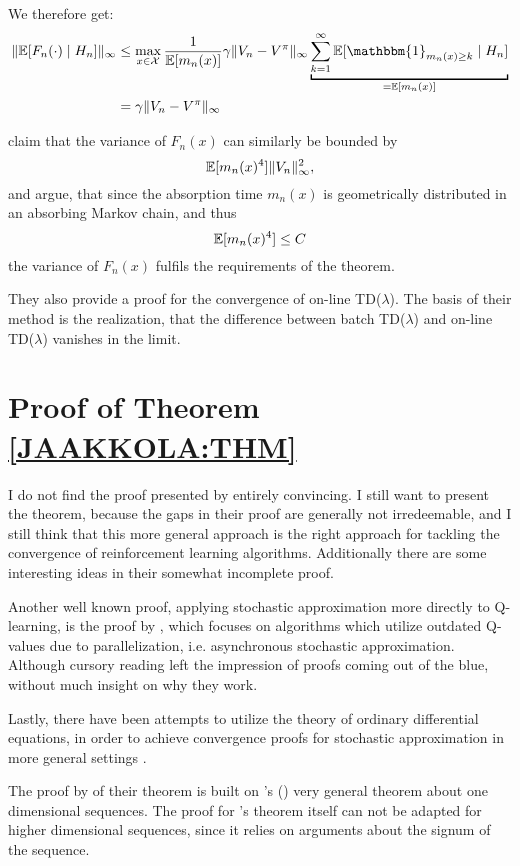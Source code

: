 We therefore get:
\begin{align*}
    \|\E[F_n(\cdot)\mid H_n]\|_\infty 
    &\le \max_{x\in\cX}\frac{1}{\E[m_n(x)]}
    \gamma \|V_n-V^\pi\|_\infty \underbracket[1pt]{\sum_{k=1}^\infty \E[\mathbbm{1}_{m_n(x)\ge k}\mid H_n]}_{=\E[m_n(x)]}\\
    &=\gamma \|V_n-V^\pi\|_\infty
\end{align*}

\textcite{jaakkolaConvergenceStochasticIterative1994a} claim that the variance of \(F_n(x)\) can similarly be bounded by 
\[
    \mathbb{E}[m_n(x)^4]\|V_n\|_\infty^2,
\]
and argue, that since the absorption time \(m_n(x)\) is geometrically distributed in an absorbing Markov chain, and thus
\[
    \mathbb{E}[m_n(x)^4]\le C
\]
the variance of \(F_n(x)\) fulfils the requirements of the theorem.

They also provide a proof for the convergence of on-line TD(\(\lambda\)). The basis of their method is the realization, that the difference between batch TD(\(\lambda\)) and on-line TD(\(\lambda\)) vanishes in the limit. 

\section{Proof of Theorem \ref{JAAKKOLA:THM}}
I do not find the proof presented by \citeauthor{jaakkolaConvergenceStochasticIterative1994a} entirely convincing. I still want to present the theorem, because the gaps in their proof are generally not irredeemable, and I still think that this more general approach is the right approach for tackling the convergence of reinforcement learning algorithms. Additionally there are some interesting ideas in their somewhat incomplete proof.

Another well known proof, applying stochastic approximation more directly to Q-learning, is the proof by \textcite{tsitsiklisAsynchronousStochasticApproximation1994}, which focuses on algorithms which utilize outdated Q-values due to parallelization, i.e. asynchronous stochastic approximation. Although cursory reading left the impression of proofs coming out of the blue, without much insight on why they work.  

Lastly, there have been attempts to utilize the theory of ordinary differential equations, in order to achieve convergence proofs for stochastic approximation in more general settings \parencite{kushnerStochasticApproximationAlgorithms1997,borkarMethodConvergenceStochastic2000}.

The proof by \citeauthor{jaakkolaConvergenceStochasticIterative1994a} of their theorem is built on \citeauthor{dvoretzkyStochasticApproximation1956}'s (\citeyear{dvoretzkyStochasticApproximation1956}) very general theorem about one dimensional sequences. The proof for \citeauthor{dvoretzkyStochasticApproximation1956}'s theorem itself can not be adapted for higher dimensional sequences, since it relies on arguments about the signum of the sequence. 


